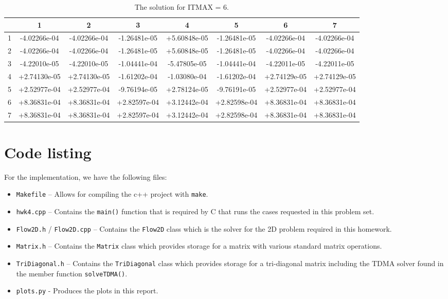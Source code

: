 \documentclass{article}
\begin{document}
\def\arraystretch{1.00}
\begin{table}[H]
	\scriptsize
	\centering
	\caption{The solution for ITMAX = 6.}
	\vspace{0.2cm}
	\begin{tabular}{c|S|S|S|S|S|S|S}
		& {1} & {2} & {3} & {4} & {5} & {6} & {7} \\
		 & -4.02266e-04 & -4.02266e-04 & -1.26481e-05 & +5.60848e-05 & -1.26481e-05 & -4.02266e-04 & -4.02266e-04 \\
		2 & -4.02266e-04 & -4.02266e-04 & -1.26481e-05 & +5.60848e-05 & -1.26481e-05 & -4.02266e-04 & -4.02266e-04 \\
		3 & -4.22010e-05 & -4.22010e-05 & -1.04441e-04 & -5.47805e-05 & -1.04441e-04 & -4.22011e-05 & -4.22011e-05 \\
		4 & +2.74130e-05 & +2.74130e-05 & -1.61202e-04 & -1.03080e-04 & -1.61202e-04 & +2.74129e-05 & +2.74129e-05 \\
		5 & +2.52977e-04 & +2.52977e-04 & -9.76194e-05 & +2.78124e-05 & -9.76191e-05 & +2.52977e-04 & +2.52977e-04 \\
		6 & +8.36831e-04 & +8.36831e-04 & +2.82597e-04 & +3.12442e-04 & +2.82598e-04 & +8.36831e-04 & +8.36831e-04 \\
		7 & +8.36831e-04 & +8.36831e-04 & +2.82597e-04 & +3.12442e-04 & +2.82598e-04 & +8.36831e-04 & +8.36831e-04
	\end{tabular}
	\label{table:symmetric-p}
\end{table}

\section*{Code listing}

For the implementation, we have the following files:
\begin{itemize}
	\item \texttt{Makefile} -- Allows for compiling the c++ project with \texttt{make}.
	\item \texttt{hwk4.cpp} -- Contains the \texttt{main()} function that is required by C that runs the cases requested in this problem set.
	\item \texttt{Flow2D.h} / \texttt{Flow2D.cpp} -- Contains the \texttt{Flow2D} class which is the solver for the 2D problem required in this homework.
	\item \texttt{Matrix.h} -- Contains the \texttt{Matrix} class which provides storage for a matrix with various standard matrix operations.
	\item \texttt{TriDiagonal.h} -- Contains the \texttt{TriDiagonal} class which provides storage for a tri-diagonal matrix including the TDMA solver found in the member function \texttt{solveTDMA()}.
	\item \texttt{plots.py} - Produces the plots in this report.
\end{itemize}
\end{document}
